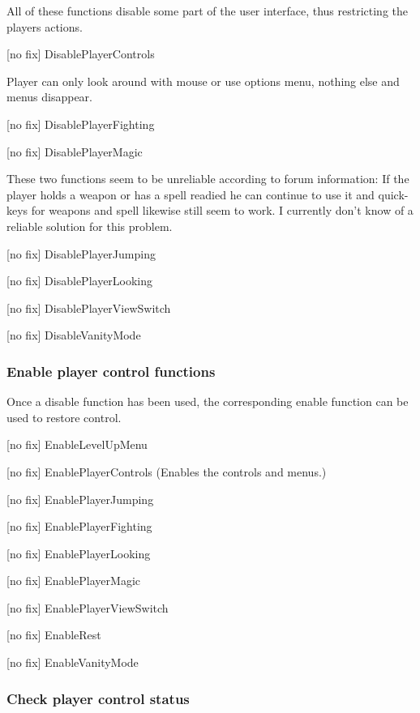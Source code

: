 \documentclass[
]{article}
\begin{document}
All of these functions disable some part of the user interface, thus
restricting the players actions.

{[}no fix{]} DisablePlayerControls

Player can only look around with mouse or use options menu, nothing else
and menus disappear.

{[}no fix{]} DisablePlayerFighting

{[}no fix{]} DisablePlayerMagic

These two functions seem to be unreliable according to forum
information: If the player holds a weapon or has a spell readied he can
continue to use it and quick-keys for weapons and spell likewise still
seem to work. I currently don't know of a reliable solution for this
problem.

{[}no fix{]} DisablePlayerJumping

{[}no fix{]} DisablePlayerLooking

{[}no fix{]} DisablePlayerViewSwitch

{[}no fix{]} DisableVanityMode

\hypertarget{enable-player-control-functions}{%
\subsubsection{Enable player control
functions}\label{enable-player-control-functions}}

Once a disable function has been used, the corresponding enable function
can be used to restore control.

{[}no fix{]} EnableLevelUpMenu

{[}no fix{]} EnablePlayerControls (Enables the controls and menus.)

{[}no fix{]} EnablePlayerJumping

{[}no fix{]} EnablePlayerFighting

{[}no fix{]} EnablePlayerLooking

{[}no fix{]} EnablePlayerMagic

{[}no fix{]} EnablePlayerViewSwitch

{[}no fix{]} EnableRest

{[}no fix{]} EnableVanityMode

\hypertarget{check-player-control-status}{%
\subsubsection{Check player control
status}\label{check-player-control-status}}
\end{document}
